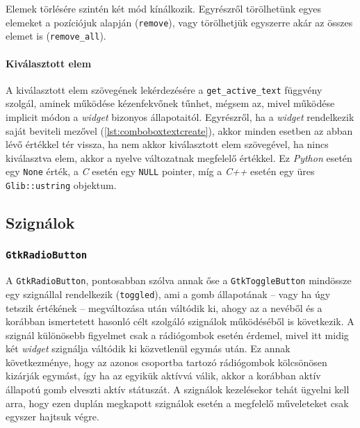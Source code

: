 Elemek törlésére szintén két mód kínálkozik. Egyrészről törölhetünk egyes elemeket a pozíciójuk alapján (\texttt{remove}), vagy törölhetjük egyszerre akár az összes elemet is (\texttt{remove\_all}).

\paragraph{Kiválasztott elem}

A kiválasztott elem szövegének lekérdezésére a \texttt{get\_active\_text} függvény szolgál, aminek működése kézenfekvőnek tűnhet, mégsem az, mivel működése implicit módon a \textit{widget} bizonyos állapotaitól. Egyrészről, ha a \textit{widget} rendelkezik saját beviteli mezővel (\ref{lst:comboboxtextcreate}), akkor minden esetben az abban lévő értékkel tér vissza, ha nem akkor kiválasztott elem szövegével, ha nincs kiválasztva elem, akkor a nyelve változatnak megfelelő értékkel. Ez \textit{Python} esetén egy \texttt{None} érték, a \textit{C} esetén egy \texttt{NULL} pointer, míg a \textit{C++} esetén egy üres \texttt{Glib::ustring} objektum. 

\subsection{Szignálok}

\subsubsection{\texttt{GtkRadioButton}}

A \texttt{GtkRadioButton}, pontosabban szólva annak őse a \texttt{GtkToggleButton} mindössze egy szignállal rendelkezik (\texttt{toggled}), ami a gomb állapotának -- vagy ha úgy tetszik értékének -- megváltozása után váltódik ki, ahogy az a nevéből és a korábban ismertetett hasonló célt szolgáló szignálok működéséből is következik. A szignál különösebb figyelmet csak a rádiógombok esetén érdemel, mivel itt midig két \textit{widget} szignálja váltódik ki közvetlenül egymás után. Ez annak következménye, hogy az azonos csoportba tartozó rádiógombok kölcsönösen kizárják egymást, így ha az egyikük aktívvá válik, akkor a korábban aktív állapotú gomb elveszti aktív státuszát. A szignálok kezelésekor tehát ügyelni kell arra, hogy ezen duplán megkapott szignálok esetén a megfelelő műveleteket csak egyszer hajtsuk végre.

